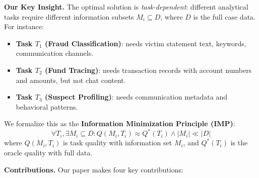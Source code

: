 \documentclass[letterpaper]{article}
\begin{document}


\textbf{Our Key Insight.} The optimal solution is \emph{task-dependent}: different analytical tasks require different information subsets $M_i \subseteq D$, where $D$ is the full case data.
%
For instance:
\begin{itemize}
    \item \textbf{Task $T_1$ (Fraud Classification)}: needs victim statement text, keywords, communication channels.
    \item \textbf{Task $T_2$ (Fund Tracing)}: needs transaction records with account numbers and amounts, but not chat content.
    \item \textbf{Task $T_3$ (Suspect Profiling)}: needs communication metadata and behavioral patterns.
\end{itemize}
%
We formalize this as the \textbf{Information Minimization Principle (IMP)}:
%
\begin{equation}
    \forall T_i, \exists M_i \subseteq D : Q(M_i, T_i) \approx Q^*(T_i) \land |M_i| \ll |D|
\end{equation}
%
where $Q(M_i, T_i)$ is task quality with information set $M_i$, and $Q^*(T_i)$ is the oracle quality with full data.

\textbf{Contributions.} Our paper makes four key contributions:
\end{document}
